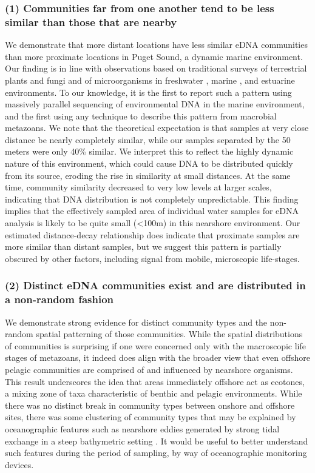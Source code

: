 \documentclass[11pt,letterpaper]{article} %
\begin{document}
\subsubsection*{(1) Communities far from one another tend to be less similar than those that are nearby}
We demonstrate that more distant locations have less similar eDNA communities than more proximate locations in Puget Sound, a dynamic marine environment. Our finding is in line with observations based on traditional surveys of terrestrial plants and fungi \citep{Nekola1999, Bahram2013, Condit2002, Chust2006} and of microorganisms in freshwater \citep{Wetzel2012}, marine \citep{Chust2013}, and estuarine \citep{Martiny2011} environments. To our knowledge, it is the first to report such a pattern using massively parallel sequencing of environmental DNA in the marine environment, and the first using any technique to describe this pattern from macrobial metazoans. We note that the theoretical expectation is that samples at very close distance be nearly completely similar, while our samples separated by the 50 meters were only 40\% similar. We interpret this to reflect the highly dynamic nature of this environment, which could cause DNA to be distributed quickly from its source, eroding the rise in similarity at small distances. At the same time, community similarity decreased to very low levels at larger scales, indicating that DNA distribution is not completely unpredictable. This finding implies that the effectively sampled area of individual water samples for eDNA analysis is likely to be quite small (<100m) in this nearshore environment. Our estimated distance-decay relationship does indicate that proximate samples are more similar than distant samples, but we suggest this pattern is partially obscured by other factors, including signal from mobile, microscopic life-stages.


\subsubsection*{(2) Distinct eDNA communities exist and are distributed in a non-random fashion}
 We demonstrate strong evidence for distinct community types and the non-random spatial patterning of those communities. While the spatial distributions of communities is surprising if one were concerned only with the macroscopic life stages of metazoans, it indeed does align with the broader view that even offshore pelagic communities are comprised of and influenced by nearshore organisms. This result underscores the idea that areas immediately offshore act as ecotones, a mixing zone of taxa characteristic of benthic and pelagic environments. While there was no distinct break in community types between onshore and offshore sites, there was some clustering of community types that may be explained by oceanographic features such as nearshore eddies generated by strong tidal exchange in a steep bathymetric setting \citep{Yang2010}. It would be useful to better understand such features during the period of sampling, by way of oceanographic monitoring devices.
\end{document}
